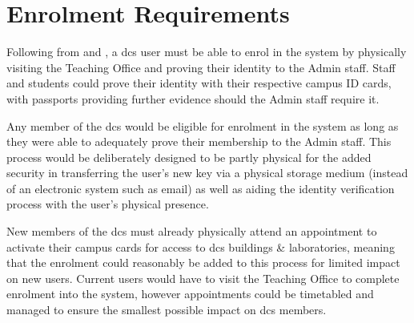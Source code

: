 \section{Enrolment Requirements}
\label{sec:analysis_enrolment}

Following from  and , a \acrfull{dcs} user must be able to enrol in the \theResServer system by physically visiting the Teaching Office and proving their identity to the Admin staff. Staff and students could prove their identity with their respective campus ID cards, with passports providing further evidence should the Admin staff require it.

Any member of the \acrfull{dcs} would be eligible for enrolment in the system as long as they were able to adequately prove their membership to the Admin staff. This process would be deliberately designed to be partly physical for the added security in transferring the user's new key via a physical storage medium (instead of an electronic system such as email) as well as aiding the identity verification process with the user's physical presence.

New members of the \acrshort{dcs} must already physically attend an appointment to activate their campus cards for access to \acrshort{dcs} buildings \& laboratories, meaning that the \theResServer enrolment could reasonably be added to this process for limited impact on new users. Current users would have to visit the Teaching Office to complete enrolment into the system, however appointments could be timetabled and managed to ensure the smallest possible impact on \acrshort{dcs} members.
